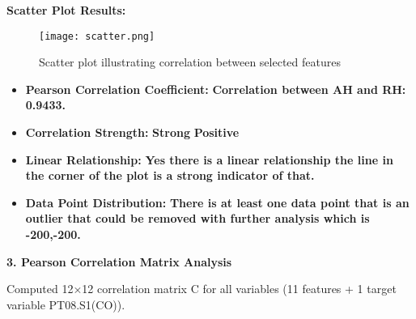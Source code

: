 \documentclass{article}
\begin{document}
\textbf{Scatter Plot Results:}
\begin{figure}[h!]
    \centering
    \texttt{[image: scatter.png]}
    \caption{Scatter plot illustrating correlation between selected features}
    \label{fig:scatter}
\end{figure} 
\vspace{5cm}
\begin{itemize}
    \item \textbf{Pearson Correlation Coefficient:} \textbf{Correlation between AH and RH: 0.9433.}
    \item \textbf{Correlation Strength:} \textbf{Strong} \textbf{Positive}
    \item \textbf{Linear Relationship:} \textbf{Yes there is a linear relationship the line in the corner of the plot is a strong indicator of that.}
    \item \textbf{Data Point Distribution:} \textbf{There is at least one data point that is an outlier that could be removed with further analysis which is -200,-200.}
\end{itemize}


\vspace{1cm}
\textbf{3. Pearson Correlation Matrix Analysis}

Computed 12×12 correlation matrix C for all variables (11 features + 1 target variable PT08.S1(CO)).
\end{document}
